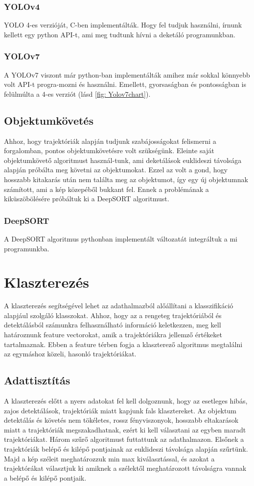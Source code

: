 \documentclass[acmtog, authorversion]{acmart}
\begin{document}
\subsubsection{YOLOv4}
YOLO 4-es verzióját, C-ben implementálták. Hogy fel tudjuk használni, írnunk kellett egy python API-t, ami meg tudtunk hívni a
deketáló programunkban.
\subsubsection{YOLOv7}
A YOLOv7 viszont már python-ban implementálták amihez már sokkal könnyebb volt API-t progra-mozni és használni. Emellett, gyorsaságban
és pontosságban is felülmúlta a 4-es verziót (lásd \ref{fig: Yolov7chart}).
\subsection{Objektumkövetés}
Ahhoz, hogy trajektóriák alapján tudjunk szabájosságokat felismerni a forgalomban, pontos objektumkövetésre volt szükségünk. Eleinte
saját objektumkövető algoritmust használ-tunk, ami deketálások euklideszi távolsága alapján próbálta meg követni az objektumokat.
Ezzel az volt a gond, hogy hosszabb kitakarás után nem találta meg az objektumot, így egy új objektumnak számított, ami a kép
közepéből bukkant fel. Ennek a problémának a kiküszöbölésére próbáltuk ki a DeepSORT algoritmust.
\subsubsection{DeepSORT}
A DeepSORT algoritmus pythonban implementált változatát integráltuk a mi programunkba.

\section{Klaszterezés}
A klaszterezés segítségével lehet az adathalmazból alőállítani a klasszifikáció alapjául szolgáló klasszokat. Ahhoz, hogy az
a rengeteg trajektóriából és detektálásból számunkra felhasználható információ keletkezzen, meg kell határoznunk feature
vectorokat, amik a trajektóriákra jellemző értékeket tartalmaznak. Ebben a feature térben fogja a klaszterező algoritmus
megtalálni az egymáshoz közeli, hasonló trajektóriákat.
\subsection{Adattisztítás}
A klaszterezés előtt a nyers adatokat fel kell dolgoznunk, hogy az esetleges hibás, zajos detektálások, trajektóriák miatt
kapjunk fals klasztereket. Az objektum detektálás és követés nem tökéletes, rossz fényviszonyok, hosszabb eltakarások miatt 
a trajektóriák megszakadhatnak, ezért ki kell választani az egyben maradt trajektóriákat. Három szűrő algoritmust futtattunk 
az adathalmazon. Elsőnek a trajektóriák belépő és kilépő pontjainak az euklideszi távolsága alapján szűrtünk.
Majd a kép széleit meghatározzuk min max kiválasztással, és azokat a trajektórákat választjuk ki amiknek a szélektől meghatározott
távolságra vannak a belépő és kilépő pontjaik.
\end{document}
